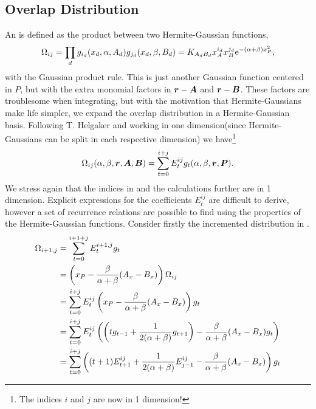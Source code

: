 \subsection{Overlap Distribution}
    An  is defined as the product between two
    Hermite-Gaussian functions,
        \begin{equation}
            \Omega_{ij} = \prod_d g_{i_d}(x_d,\alpha,A_d)g_{j_d}(x_d,\beta,B_d)
            =
            K_{A_dB_d}x_A^{i_d}x_B^{j_d}\mathrm{e}^{-(\alpha+\beta)x^2_P},
        \end{equation}
    with the Gaussian product rule. This is just another Gaussian function
    centered in $P$, but with the extra monomial factors in $\boldsymbol{{r}}-\boldsymbol{{A}}$
    and $\boldsymbol{{r}}-\boldsymbol{{B}}$. These factors are troublesome when integrating,
    but with the motivation that Hermite-Gaussians make life simpler, we expand
    the overlap distribution in a Hermite-Gaussian basis. Following T.
    Helgaker\cite{HelgakerTaylorGauss} and working in one dimension(since
    Hermite-Gaussians can be split in each respective dimension) we
    have\footnote{The indices $i$ and $j$ are now in 1 dimension!}
        \begin{equation}
            \Omega_{ij}(\alpha,\beta,\blds{r},\blds{A},\blds{B}) =
            \sum\limits^{i+j}_{t=0} E^{ij}_tg_t(\alpha,\beta,\blds{r},\blds{P}).
            \label{eq:omegaDef}
        \end{equation}
    We stress again that the indices in  and the calculations
    further are in 1 dimension. Explicit expressions for the coefficients
    $E^{ij}_t$ are difficult to derive, however a set of recurrence relations
    are possible to find using the properties of the Hermite-Gaussian
    functions. Consider firstly the incremented distribution in
    .
        \begin{align}
            \Omega_{i+1,j} &= \sum^{i+1+j}_{t=0} E^{i+1,j}_tg_t \nonumber \\
            &= \left(x_P -
            \frac{\beta}{\alpha+\beta}(A_x-B_x)\right)\Omega_{ij} \nonumber \\
            &= \suml{t=0}{i+j} E^{ij}_t\left(x_P -
            \frac{\beta}{\alpha+\beta}(A_x-B_x)\right) g_t \nonumber \\
            &= \suml{t=0}{i+j} E^{ij}_t\left(\left(tg_{t-1} +
            \frac{1}{2(\alpha+\beta)}g_{t+1}\right) -
            \frac{\beta}{\alpha+\beta}(A_x-B_x)g_t\right) \nonumber \\
            &= \suml{t=0}{i+j} \left((t+1)E^{ij}_{t+1} +
            \frac{1}{2(\alpha+\beta)}E^{ij}_{j-1} -
            \frac{\beta}{\alpha+\beta}(A_x-B_x)\right)g_t
            \label{eq:omegaIncr}
        \end{align}
